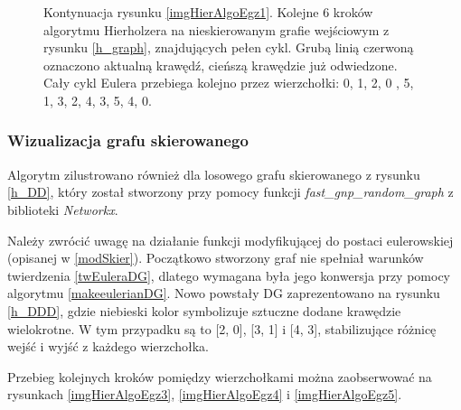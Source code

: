 \documentclass[a4paper, 12pt, twoside, openright]{article}
\begin{document}
\begin{figure}[!p]
		\quad
		
		\caption[]{Kontynuacja rysunku \ref{imgHierAlgoEgz1}. Kolejne 6 kroków algorytmu Hierholzera na nieskierowanym grafie wejściowym z rysunku \ref{h_graph}, znajdujących pełen cykl. Grubą linią czerwoną oznaczono aktualną krawędź, cieńszą krawędzie już odwiedzone. Cały cykl Eulera przebiega kolejno przez wierzchołki: 0, 1, 2, 0 , 5, 1, 3, 2, 4, 3, 5, 4, 0.}
		\label{imgHierAlgoEgz2}
	\end{figure}
\newpage
\subsubsection{Wizualizacja grafu skierowanego}
\indent\par
	Algorytm zilustrowano również dla losowego grafu skierowanego z rysunku \ref{h_DD}, który został stworzony przy pomocy funkcji \textit{fast\_gnp\_random\_graph} z biblioteki \textit{Networkx}. 
	
	Należy zwrócić uwagę na działanie funkcji modyfikującej do postaci eulerowskiej (opisanej w \ref{modSkier}). Początkowo stworzony graf nie spełniał warunków twierdzenia \ref{twEuleraDG}, dlatego wymagana była jego konwersja przy pomocy algorytmu \ref{makeeulerianDG}. Nowo powstały DG zaprezentowano na rysunku \ref{h_DDD}, gdzie niebieski kolor symbolizuje sztuczne dodane krawędzie wielokrotne. W tym przypadku są to [2, 0], [3, 1] i [4, 3], stabilizujące różnicę wejść i wyjść z każdego wierzchołka.
	
	Przebieg kolejnych kroków pomiędzy wierzchołkami można zaobserwować na rysunkach \ref{imgHierAlgoEgz3}, \ref{imgHierAlgoEgz4} i \ref{imgHierAlgoEgz5}.
	
\end{document}
